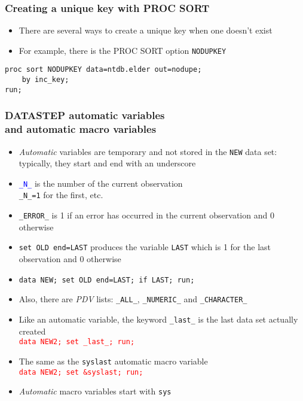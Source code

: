 \documentclass[11pt,pdftex,dvipsnames,usenames,helvetica]{beamer}
\begin{document}
\begin{frame}[fragile]
\frametitle{Creating a unique key with PROC SORT}
\begin{itemize}
\item There are several ways to create a unique key when one doesn't exist
\item For example, there is the PROC SORT option {\tt NODUPKEY}
\end{itemize}
\begin{verbatim}
proc sort NODUPKEY data=ntdb.elder out=nodupe;
    by inc_key;
run;
\end{verbatim}
\end{frame}

\begin{frame}[fragile]
\frametitle{DATASTEP automatic variables\\ and automatic macro variables}
\begin{itemize}
\item {\it Automatic} variables 
  are temporary and not stored in the {\tt NEW} data set:
typically, they start and end with an underscore
\item \textcolor{blue}{\tt \_N\_} is the number of the current observation\\
{\tt \_N\_=1} for the first, etc.
\item {\tt \_ERROR\_} is 1 if an error has occurred in the
current observation and 0 otherwise
\item {\tt set OLD end=LAST} produces the variable {\tt LAST} which is
  1 for the last observation and 0 otherwise
\item {\tt data NEW; set OLD end=LAST; if LAST; run;}
\item Also, there are {\it PDV} lists: {\tt \_ALL\_}, 
{\tt \_NUMERIC\_} and {\tt \_CHARACTER\_}
\item Like an automatic variable, the keyword {\tt \_last\_} is the
  last data set actually created\\
\textcolor{red}{\tt data NEW2; set \_last\_; run;}
\item The same as the {\tt syslast} automatic macro variable\\
\textcolor{red}{\tt data NEW2; set \&syslast; run;}
\item {\it Automatic} macro variables start with {\tt sys}
\end{itemize}

\end{frame}
\end{document}
